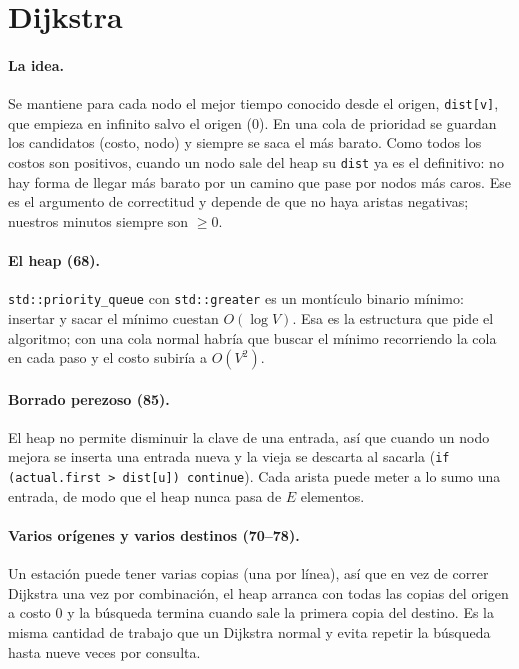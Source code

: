 \documentclass[11pt,a4paper]{article}
\newcommand{\arch}[1]{\texttt{#1}}
\begin{document}
\section{Dijkstra}

\paragraph{La idea.}
Se mantiene para cada nodo el mejor tiempo conocido desde el origen,
\arch{dist[v]}, que empieza en infinito salvo el origen (0). En una cola de
prioridad se guardan los candidatos (costo, nodo) y siempre se saca el más
barato. Como todos los costos son positivos, cuando un nodo sale del heap su
\arch{dist} ya es el definitivo: no hay forma de llegar más barato por un camino
que pase por nodos más caros. Ese es el argumento de correctitud y depende de que
no haya aristas negativas; nuestros minutos siempre son $\geq 0$.



\paragraph{El heap (68).}
\arch{std::priority\_queue} con \arch{std::greater} es un montículo binario
mínimo: insertar y sacar el mínimo cuestan $O(\log V)$. Esa es la estructura que
pide el algoritmo; con una cola normal habría que buscar el mínimo recorriendo la
cola en cada paso y el costo subiría a $O(V^2)$.

\paragraph{Borrado perezoso (85).}
El heap no permite disminuir la clave de una entrada, así que cuando un nodo
mejora se inserta una entrada nueva y la vieja se descarta al sacarla
(\arch{if (actual.first > dist[u]) continue}). Cada arista puede meter a lo sumo
una entrada, de modo que el heap nunca pasa de $E$ elementos.

\paragraph{Varios orígenes y varios destinos (70--78).}
Un estación puede tener varias copias (una por línea), así que en vez de correr
Dijkstra una vez por combinación, el heap arranca con todas las copias del origen
a costo 0 y la búsqueda termina cuando sale la primera copia del destino. Es la
misma cantidad de trabajo que un Dijkstra normal y evita repetir la búsqueda hasta
nueve veces por consulta.
\end{document}
